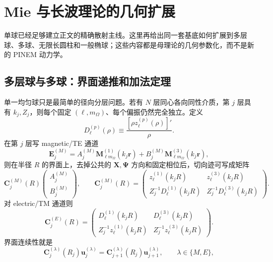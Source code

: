 \chapter{Mie 与长波理论的几何扩展}
\label{app:mie-extensions}

单球已经足够建立正文的精确散射主线。这里再给出同一套基底如何扩展到多层球、多球、无限长圆柱和一般椭球；这些内容都是母理论的几何参数化，而不是新的 PINEM 动力学。

\section{多层球与多球：界面递推和加法定理}
单一均匀球只是最简单的径向分层问题。若有 $N$ 层同心各向同性介质，第 $j$ 层具有
$k_j,Z_j$，则每个固定 $(\ell,m_{\Omega})$、每个偏振仍然完全独立。定义
\begin{equation}
D_\ell^{(p)}(\rho)
\equiv
\frac{[\rho z_\ell^{(p)}(\rho)]'}{\rho}.
\end{equation}
在第 $j$ 层写 magnetic/TE 通道
\begin{equation}
\bm E_j^{(M)}
=A_j^{(M)}\bm M_{\ell m_{\Omega}}^{(1)}(k_j\bm r)
+B_j^{(M)}\bm M_{\ell m_{\Omega}}^{(3)}(k_j\bm r),
\end{equation}
则在半径 $R$ 的界面上，去掉公共的
$\bm X,\bm\Psi$ 方向和固定相位后，切向迹可写成矩阵
\begin{equation}
\mathbf C_j^{(M)}(R)
\begin{pmatrix}A_j^{(M)}\\B_j^{(M)}\end{pmatrix},
\qquad
\mathbf C_j^{(M)}(R)
=\begin{pmatrix}
 z_\ell^{(1)}(k_jR) & z_\ell^{(3)}(k_jR)\\[0.4em]
 Z_j^{-1}D_\ell^{(1)}(k_jR) & Z_j^{-1}D_\ell^{(3)}(k_jR)
\end{pmatrix}.
\label{eq:multilayer-CM}
\end{equation}
对 electric/TM 通道则
\begin{equation}
\mathbf C_j^{(E)}(R)
=\begin{pmatrix}
 D_\ell^{(1)}(k_jR) & D_\ell^{(3)}(k_jR)\\[0.4em]
 Z_j^{-1}z_\ell^{(1)}(k_jR) & Z_j^{-1}z_\ell^{(3)}(k_jR)
\end{pmatrix}.
\label{eq:multilayer-CE}
\end{equation}
界面连续性就是
\begin{equation}
\mathbf C_j^{(\lambda)}(R_j)
\bm u_j^{(\lambda)}
=
\mathbf C_{j+1}^{(\lambda)}(R_j)
\bm u_{j+1}^{(\lambda)},
\qquad
\lambda\in\{M,E\},
\end{equation}
